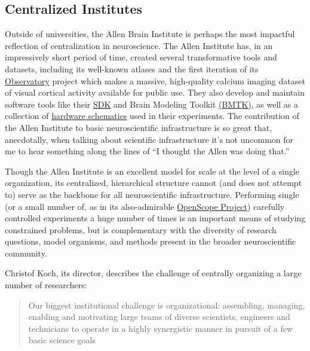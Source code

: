 \documentclass[10pt]{tufte-book}
\begin{document}
\subsection{Centralized Institutes}

Outside of universities, the Allen Brain Institute is perhaps the most
impactful reflection of centralization in neuroscience. The Allen
Institute has, in an impressively short period of time, created several
transformative tools and datasets, including its well-known atlases \citep{leinGenomewideAtlasGene2007}  and the first iteration of its
\href{http://observatory.brain-map.org/}{Observatory} project which
makes a massive, high-quality calcium imaging dataset of visual cortical
activity available for public use. They also develop and maintain
software tools like their
\href{https://allensdk.readthedocs.io/en/latest/}{SDK} and Brain
Modeling Toolkit \href{https://alleninstitute.github.io/bmtk/}{(BMTK)},
as well as a collection of
\href{https://portal.brain-map.org/explore/toolkit/hardware}{hardware
schematics} used in their experiments. The contribution of the Allen
Institute to basic neuroscientific infrastructure is so great that,
anecdotally, when talking about scientific infrastructure it's not
uncommon for me to hear something along the lines of ``I thought the
Allen was doing that.''

Though the Allen Institute is an excellent model for scale at the level
of a single organization, its centralized, hierarchical structure cannot
(and does not attempt to) serve as the backbone for all neuroscientific
infrastructure. Performing single (or a small number of, as in its
also-admirable
\href{https://alleninstitute.org/what-we-do/brain-science/news-press/articles/three-collaborative-studies-launch-openscope-shared-observatory-neuroscience}{OpenScope
Project}) carefully controlled experiments a huge number of times is an
important means of studying constrained problems, but is complementary
with the diversity of research questions, model organisms, and methods
present in the broader neuroscientific community.

Christof Koch, its director, describes the challenge of centrally
organizing a large number of researchers:

\begin{quote}
Our biggest institutional challenge is organizational: assembling,
managing, enabling and motivating large teams of diverse scientists,
engineers and technicians to operate in a highly synergistic manner in
pursuit of a few basic science goals \citep{grillnerWorldwideInitiativesAdvance2016} 
\end{quote}
\end{document}
